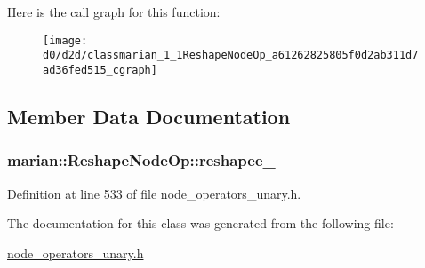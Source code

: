 Here is the call graph for this function\+:
\nopagebreak
\begin{figure}[H]
\begin{center}
\leavevmode
\texttt{[image: d0/d2d/classmarian\_1\_1ReshapeNodeOp\_a61262825805f0d2ab311d7ad36fed515\_cgraph]}
\end{center}
\end{figure}




\subsection{Member Data Documentation}
\subsubsection[{\texorpdfstring{reshapee\+\_\+}{reshapee_}}]{ marian\+::\+Reshape\+Node\+Op\+::reshapee\+\_\+\hspace{0.3cm}{\ttfamily [private]}}\hypertarget{classmarian_1_1ReshapeNodeOp_a29e5ebe2b9959994bca8b08018b11117}{}\label{classmarian_1_1ReshapeNodeOp_a29e5ebe2b9959994bca8b08018b11117}


Definition at line 533 of file node\+\_\+operators\+\_\+unary.\+h.



The documentation for this class was generated from the following file\+:\begin{DoxyCompactItemize}
\item 
\hyperlink{node__operators__unary_8h}{node\+\_\+operators\+\_\+unary.\+h}\end{DoxyCompactItemize}
